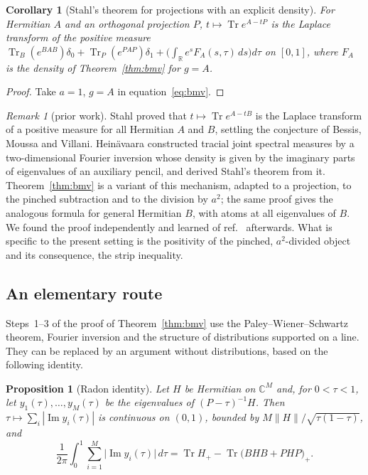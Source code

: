 \documentclass[11pt]{amsart}
\newtheorem{proposition}[theorem]{Proposition}
\newtheorem{corollary}[theorem]{Corollary}
\theoremstyle{definition}
\theoremstyle{remark}
\newtheorem{remark}[theorem]{Remark}
\numberwithin{equation}{section}
\newcommand{\R}{\mathbb{R}}
\newcommand{\C}{\mathbb{C}}
\newcommand{\Tr}{\operatorname{Tr}}
\renewcommand{\Im}{\operatorname{Im}}
\begin{document}
\begin{corollary}[Stahl's theorem for projections with an explicit density]
For Hermitian $A$ and an orthogonal projection $P$, $t\mapsto\Tr e^{A-tP}$ is the Laplace transform of the positive
measure $\Tr_B(e^{BAB})\delta_0+\Tr_P(e^{PAP})\delta_1+\bigl(\int_\R e^sF_A(s,\tau)\,ds\bigr)d\tau$ on $[0,1]$, where
$F_A$ is the density of Theorem~\ref{thm:bmv} for $g=A$.
\end{corollary}

\begin{proof}
Take $a=1$, $g=A$ in equation~\eqref{eq:bmv}.
\end{proof}

\begin{remark}[prior work]
Stahl proved that $t\mapsto\Tr e^{A-tB}$ is the Laplace transform of a positive measure for all Hermitian $A$ and
$B$\cite{Stahl,Eremenko}, settling the conjecture of Bessis, Moussa and Villani\cite{BMV,LS}. Hein\"avaara\cite{Hein}
constructed tracial joint spectral measures by a two-dimensional Fourier inversion whose density is given by the
imaginary parts of eigenvalues of an auxiliary pencil, and derived Stahl's theorem from it. Theorem~\ref{thm:bmv} is a
variant of this mechanism, adapted to a projection, to the pinched subtraction and to the division by $a^2$; the same
proof gives the analogous formula for general Hermitian $B$, with atoms at all eigenvalues of $B$. We found the proof
independently and learned of ref.~\cite{Hein} afterwards. What is specific to the present setting is the positivity of
the pinched, $a^2$-divided object and its consequence, the strip inequality.
\end{remark}

\subsection*{An elementary route}
Steps~1--3 of the proof of Theorem~\ref{thm:bmv} use the Paley--Wiener--Schwartz theorem, Fourier inversion and the
structure of distributions supported on a line. They can be replaced by an argument without distributions, based on the
following identity.

\begin{proposition}[Radon identity]\label{prop:RI}
Let $H$ be Hermitian on $\C^M$ and, for $0<\tau<1$, let $y_1(\tau),\dots,y_M(\tau)$ be the eigenvalues of
$(P-\tau)^{-1}H$. Then $\tau\mapsto\sum_i|\Im y_i(\tau)|$ is continuous on $(0,1)$, bounded by
$M\|H\|/\sqrt{\tau(1-\tau)}$, and
\[
\frac1{2\pi}\int_0^1\sum_{i=1}^M\bigl|\Im y_i(\tau)\bigr|\,d\tau=\Tr H_+-\Tr\bigl(BHB+PHP\bigr)_+ .
\]
\end{proposition}
\end{document}
